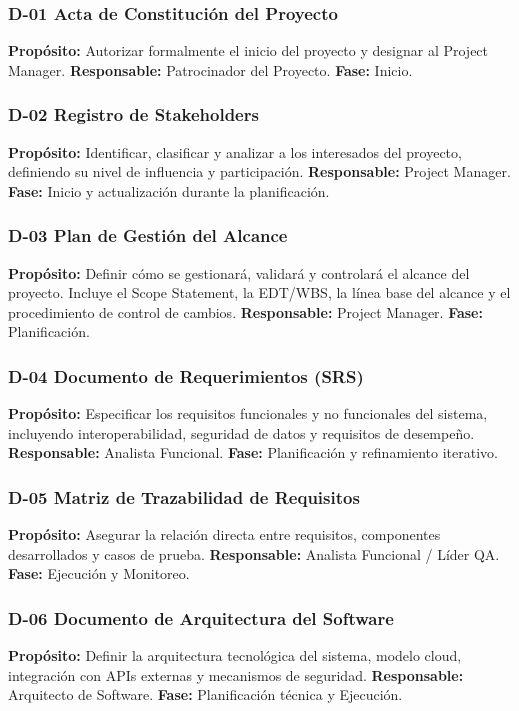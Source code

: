 \subsubsection*{D-01 Acta de Constitución del Proyecto}
\textbf{Propósito:} Autorizar formalmente el inicio del proyecto y designar al Project Manager.  
\textbf{Responsable:} Patrocinador del Proyecto.  
\textbf{Fase:} Inicio.

\subsubsection*{D-02 Registro de Stakeholders}
\textbf{Propósito:} Identificar, clasificar y analizar a los interesados del proyecto, definiendo su nivel de influencia y participación.  
\textbf{Responsable:} Project Manager.  
\textbf{Fase:} Inicio y actualización durante la planificación.

\subsubsection*{D-03 Plan de Gestión del Alcance}
\textbf{Propósito:} Definir cómo se gestionará, validará y controlará el alcance del proyecto.  
Incluye el Scope Statement, la EDT/WBS, la línea base del alcance y el procedimiento de control de cambios.  
\textbf{Responsable:} Project Manager.  
\textbf{Fase:} Planificación.

\subsubsection*{D-04 Documento de Requerimientos (SRS)}
\textbf{Propósito:} Especificar los requisitos funcionales y no funcionales del sistema, incluyendo interoperabilidad, seguridad de datos y requisitos de desempeño.  
\textbf{Responsable:} Analista Funcional.  
\textbf{Fase:} Planificación y refinamiento iterativo.

\subsubsection*{D-05 Matriz de Trazabilidad de Requisitos}
\textbf{Propósito:} Asegurar la relación directa entre requisitos, componentes desarrollados y casos de prueba.  
\textbf{Responsable:} Analista Funcional / Líder QA.  
\textbf{Fase:} Ejecución y Monitoreo.

\subsubsection*{D-06 Documento de Arquitectura del Software}
\textbf{Propósito:} Definir la arquitectura tecnológica del sistema, modelo cloud, integración con APIs externas y mecanismos de seguridad.  
\textbf{Responsable:} Arquitecto de Software.  
\textbf{Fase:} Planificación técnica y Ejecución.


